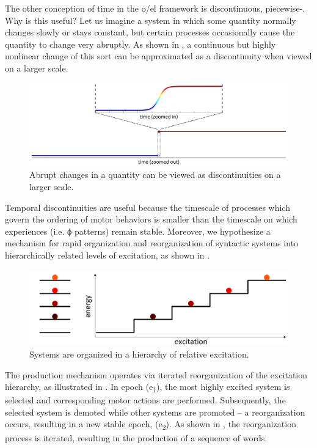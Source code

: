   The other conception of time in the o/el framework is discontinuous, piece\-wise-. Why is this useful? Let us imagine a system in which some quantity normally changes slowly or stays constant, but certain processes occasionally cause the quantity to change very abruptly. As shown in {}, a continuous but highly nonlinear change of this sort can be approximated as a discontinuity when viewed on a larger scale.

  
\begin{figure}
\includegraphics[width=\textwidth]{figures/Tilsen-img4.png}
\caption{Abrupt changes in a quantity can be viewed as discontinuities on a larger scale.}
\label{fig:1:4}
\end{figure}
 

  Temporal discontinuities are useful because the timescale of processes which govern the ordering of motor behaviors is smaller than the timescale on which  experiences (i.e. ϕ patterns) remain stable. Moreover, we hypothesize a mechanism for rapid organization and reorganization of syntactic systems into hierarchically related levels of excitation, as shown in {}.

  
\begin{figure}
\includegraphics[width=\textwidth]{figures/Tilsen-img5.png}
\caption{Systems are organized in a hierarchy of relative excitation.}
\label{fig:1:5}
\end{figure}
 

  The production mechanism operates via iterated reorganization of the excitation hierarchy, as illustrated in {}. In epoch (e\textsubscript{1}), the most highly excited system is selected and corresponding motor actions are performed. Subsequently, the selected system is demoted while other systems are promoted -- a reorganization occurs, resulting in a new stable epoch, (e\textsubscript{2}). As shown in {}, the reorganization process is iterated, resulting in the production of a sequence of words.

